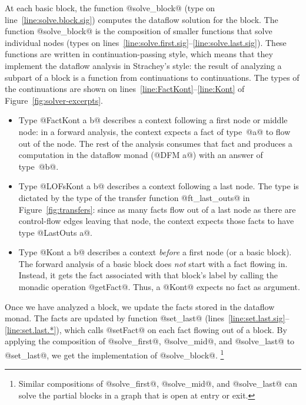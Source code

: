 \documentclass[blockstyle,preprint,natbib,nocopyrightspace]{sigplanconf}
\newcommand\lineref[1]{line~\ref{line:#1}}
\newcommand\linerangeref[2]{\mbox{lines~\ref{line:#1}--\ref{line:#2}}}
\newcommand\delendum[1]{\relax\ifvmode\else\unskip\fi\relax}
\newcommand\figref[1]{Figure~\ref{fig:#1}}
\begin{document}
At each basic block, the function @solve_block@ (type on \lineref{solve.block.sig})
computes the dataflow solution for the block.
The function @solve_block@ is the composition of
smaller functions that solve individual nodes
(types on \linerangeref{solve.first.sig}{solve.last.sig}).
These functions are written in continuation-passing style,
which means that they implement the dataflow analysis in Strachey's style:
the result of analyzing a subpart of a block is a function from
continuations to continuations. 
The types of the
continuations are shown on \linerangeref{FactKont}{Kont} of
\figref{solver-excerpts}. 
\begin{itemize}
\item
Type @FactKont a b@ describes a context following a first node or middle
node: in a forward analysis, the context expects a fact of type~@a@
to flow out of the node.
The rest of the analysis consumes that
fact and produces a computation in the
dataflow monad (@DFM a@) with an answer of type~@b@.
\item
Type @LOFsKont a b@ describes a context following a last node.
The type is dictated by the type of the transfer function
@ft_last_outs@ in \figref{transfers}:
since as many facts flow out of a last node as there are control-flow
edges leaving that node, the context expects those facts to have type
@LastOuts a@.
\item
Type @Kont a b@ describes a context \emph{before} a first node (or a
basic block).
The forward analysis of a basic block does \emph{not} start with a
fact flowing in.
Instead, it gets the fact associated with that block's label by calling
the monadic operation @getFact@.
Thus, a @Kont@ expects no fact as argument.
\end{itemize}
\delendum{I like these continuations, but I'm very puzzled about the
fuel.  If @Kont@ takes fuel in, where does it return the depleted fuel?
It must come out eventualy, because it's needed in the rest of the program.
And if it always comes out, then we should say so:
@Kont a b = DFM a b@.
And once you do that, it's plain that @Kont@ is just a state monad,
and I can't see why it isn't part of @DFM@ in the first place.}

Once we have analyzed a block, we update the facts stored in
the dataflow monad.
The facts are updated by function @set_last@
(\linerangeref{set.last.sig}{set.last.*}), which calls @setFact@ on each fact
flowing out of a block.
By applying the composition
of @solve_first@, @solve_mid@, and @solve_last@ to @set_last@, we get
the implementation of @solve_block@.
\footnote{Similar
  compositions of @solve\_first@, @solve\_mid@, and @solve\_last@
  can solve the partial blocks in a graph that is open
  at entry or exit.}
\end{document}
